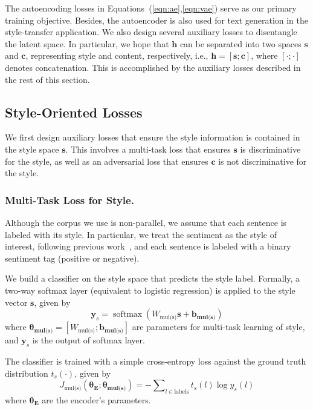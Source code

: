 \documentclass[letterpaper]{article} %
\newcommand{\loss}[1]{J_{\text{#1}}}
\newcommand{\nnweight}[1]{\bm{\theta_{\text{#1}}}}
\newcommand{\weight}[1]{W_{\text{#1}}}
\newcommand{\bias}[1]{\bm{b_{\text{#1}}}}
\begin{document}
The autoencoding losses in Equations~(\ref{eqn:ae},\ref{eqn:vae}) serve as our primary training objective.
Besides, the autoencoder is also used for text generation in the style-transfer application.
We also design several auxiliary losses to disentangle the latent space. In particular, we hope that $\bm h$ can be separated into two spaces $\bm s$ and $\bm c$, representing style and content, respectively, i.e., $\bm h = [\bm s ; \bm c]$, where $[\cdot;\cdot]$ denotes concatenation.
This is accomplished by the auxiliary losses described in the rest of this section.


\subsection{Style-Oriented Losses}

We first design auxiliary losses that ensure the style information is contained in the style space $\bm s$.
This involves a multi-task loss that ensures $\bm s$ is discriminative for the style, as well as an adversarial loss that ensures $\bm c$ is not discriminative for the style.

\subsubsection{Multi-Task Loss for Style.} \label{ssec:multitask-style-objective}
Although the corpus we use is non-parallel, we assume that each sentence is labeled with its style. In particular, we treat the sentiment as the style of interest, following previous work~\cite{hu2017toward,shen2017style,fu2018style,zhao2018adversarially}, and each sentence is labeled with a binary sentiment tag (positive or negative).

We build a classifier on the style space that predicts the style label. Formally, a two-way softmax layer (equivalent to logistic regression) is applied to the style vector $\bm s$, given by
\begin{equation} \label{eqn:class-pred}
	\bm y_s = \operatorname{softmax}(\weight{mul(s)} \bm s + \bias{mul(s)})
\end{equation}
where $\nnweight{mul(s)}=[\weight{mul(s)}; \bias{mul(s)}]$ are parameters for multi-task learning of style, and $\bm y_s$ is the output of softmax layer.

The classifier is trained with a simple cross-entropy loss against the ground truth distribution $t_s(\cdot)$, given by
\begin{equation} \label{eqn:style-multi-task-loss}
	\loss{mul(s)}(\nnweight{E};\nnweight{mul(s)}) = - \sum\nolimits_{l\in\text{labels}} t_s(l)\log y_s(l)
\end{equation}
where $\nnweight{E}$ are the encoder's parameters.
\end{document}
